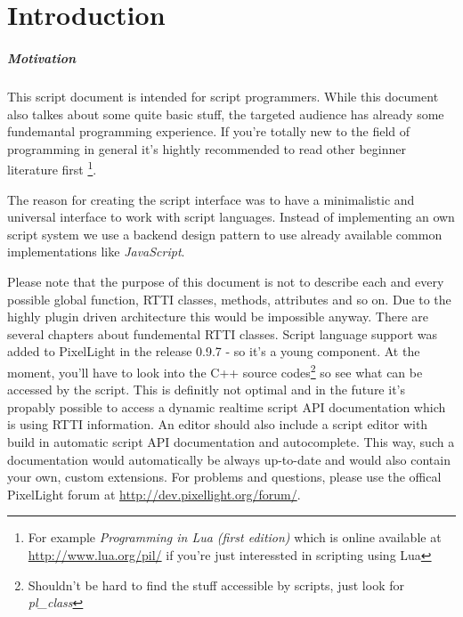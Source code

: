 \chapter{Introduction}


\paragraph{Motivation}
This script document is intended for script programmers. While this document also talkes about some quite basic stuff, the targeted audience has already some fundemantal programming experience. If you're totally new to the field of programming in general it's hightly recommended to read other beginner literature first \footnote{For example \emph{Programming in Lua (first edition)} which is online available at \url{http://www.lua.org/pil/} if you're just interessted in scripting using Lua}.

The reason for creating the script interface was to have a minimalistic and universal interface to work with script languages. Instead of implementing an own script system we use a backend design pattern to use already available common implementations like \emph{JavaScript}.

Please note that the purpose of this document is not to describe each and every possible global function, RTTI classes, methods, attributes and so on. Due to the highly plugin driven architecture this would be impossible anyway. There are several chapters about fundemental RTTI classes. Script language support was added to PixelLight in the release 0.9.7 - so it's a young component. At the moment, you'll have to look into the C++ source codes\footnote{Shouldn't be hard to find the stuff accessible by scripts, just look for \emph{pl\_class}} so see what can be accessed by the script. This is definitly not optimal and in the future it's propably possible to access a dynamic realtime script API documentation which is using RTTI information. An editor should also include a script editor with build in automatic script API documentation and autocomplete. This way, such a documentation would automatically be always up-to-date and would also contain your own, custom extensions. For problems and questions, please use the offical PixelLight forum at \url{http://dev.pixellight.org/forum/}.

